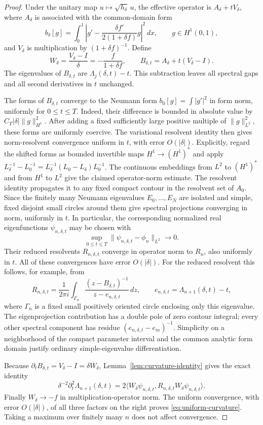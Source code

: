 \documentclass[11pt,a4paper]{article}
\theoremstyle{definition}\newtheorem{definition}[theorem]{Definition}
\theoremstyle{remark}\newtheorem{remark}[theorem]{Remark}
\begin{document}
\begin{proof}
Under the unitary map $u\mapsto\sqrt{h_\delta}\,u$, the effective
operator is $A_\delta+tV_\delta$, where $A_\delta$ is associated
with the common-domain form
\[
 b_\delta[g]=\int_0^1\left|g'
       -\frac{\delta f'}{2(1+\delta f)}g\right|^2\,dx,
       \qquad g\in H^1(0,1),
\]
and $V_\delta$ is multiplication by $(1+\delta f)^{-1}$. Define
\[
 W_\delta=\frac{V_\delta-I}{\delta}
             =-\frac{f}{1+\delta f},\qquad
 B_{\delta,t}=A_\delta+t(V_\delta-I).
\]
The eigenvalues of $B_{\delta,t}$ are
$\Lambda_j(\delta,t)-t$. This subtraction leaves all spectral
gaps and all second derivatives in $t$ unchanged.

The forms of $B_{\delta,t}$ converge to the Neumann form
$b_0[g]=\int|g'|^2$ in form norm, uniformly for $0\leq t\leq T$.
Indeed, their difference is bounded in absolute value by
$C_T|\delta|\|g\|_{H^1}^2$. After adding a fixed sufficiently
large positive multiple of $\|g\|_{L^2}^2$, these forms are
uniformly coercive. The variational resolvent identity then gives
norm-resolvent convergence uniform in $t$, with error $O(|\delta|)$.
Explicitly, regard the shifted forms as bounded invertible maps
$H^1\to(H^1)^*$ and apply
$L_\delta^{-1}-L_0^{-1}
=L_\delta^{-1}(L_0-L_\delta)L_0^{-1}$.
The continuous embeddings from $L^2$ to $(H^1)^*$ and from
$H^1$ to $L^2$ give the claimed operator-norm estimate.
The resolvent identity propagates it to any fixed compact contour
in the resolvent set of $A_0$. Since the finitely
many Neumann eigenvalues $E_0,\ldots,E_N$ are isolated and simple,
fixed disjoint small circles around them give spectral
projections converging in norm, uniformly in $t$. In particular,
the corresponding normalized real eigenfunctions
$\psi_{n,\delta,t}$ may be chosen with
\[
 \sup_{0\leq t\leq T}\|\psi_{n,\delta,t}-\phi_n\|_{L^2}\to0.
\]
Their reduced resolvents $R_{n,\delta,t}$ converge in operator
norm to $R_n$, also uniformly in $t$. All of these convergences have error $O(|\delta|)$.
For the reduced resolvent this follows, for example, from
\[
 R_{n,\delta,t}=\frac{1}{2\pi i}
 \int_{\Gamma_n}\frac{(z-B_{\delta,t})^{-1}}
                        {z-e_{n,\delta,t}}\,dz,
 \qquad e_{n,\delta,t}=\Lambda_{n+1}(\delta,t)-t,
\]
where $\Gamma_n$ is a fixed small positively oriented circle
enclosing only this eigenvalue. The eigenprojection contribution
has a double pole of zero contour integral; every other spectral
component has residue $(e_{n,\delta,t}-e_m)^{-1}$. Simplicity on a neighborhood of the compact
parameter interval and the common analytic form domain justify
ordinary simple-eigenvalue differentiation.

Because $\partial_tB_{\delta,t}=V_\delta-I=\delta W_\delta$,
Lemma~\ref{lem:curvature-identity} gives the exact
identity
\[
 \delta^{-2}\partial_t^2\Lambda_{n+1}(\delta,t)
 =2\langle W_\delta\psi_{n,\delta,t},
          R_{n,\delta,t}W_\delta\psi_{n,\delta,t}\rangle.
\]
Finally $W_\delta\to-f$ in multiplication-operator norm. The
uniform convergence, with error $O(|\delta|)$, of all three
factors on the right proves
\eqref{eq:uniform-curvature}. Taking a maximum over finitely
many $n$ does not affect convergence.
\end{proof}
\end{document}
